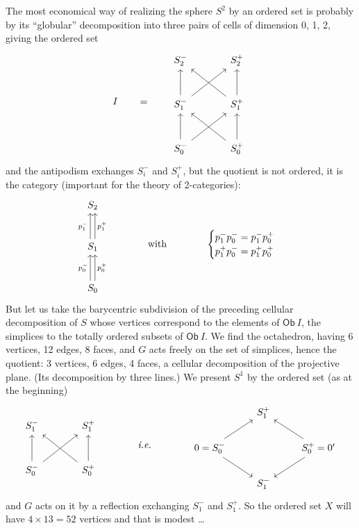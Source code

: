 The most economical way of realizing the sphere $S^2$ by an ordered set is probably by its ``globular'' decomposition into three pairs of cells of dimension 0, 1, 2, giving the ordered set
\[
I \qquad = \qquad
\begin{tikzcd}[row sep=large, column sep=large]
S_2^- & S_2^+ \\
S_1^- \arrow[u] \arrow[ur] & S_1^+ \arrow[u] \arrow[ul] \\
S_0^- \arrow[u] \arrow[ur] & S_0^+ \arrow[u] \arrow[ul]
\end{tikzcd}
\]
and the antipodism exchanges $S_i^-$ and $S_i^+$, but the quotient is not ordered, it is the category (important for the theory of 2-categories):
\[
\begin{tikzcd}[row sep=large]
S_2 \\
S_1 \arrow[u, shift left, "p_1^-"] \arrow[u, shift right, "p_1^+"'] \\
S_0 \arrow[u, shift left, "p_0^-"] \arrow[u, shift right, "p_0^+"']
\end{tikzcd}
\qquad\qquad \text{with} \qquad\qquad
\begin{cases}
p_1^- p_0^- = p_1^- p_0^+ \\
p_1^+ p_0^- = p_1^+ p_0^+
\end{cases}
\]
But let us take the barycentric subdivision of the preceding cellular decomposition of $S$ whose vertices correspond to the elements of $\mathsf{Ob}\ I$, the simplices to the totally ordered subsets of $\mathsf{Ob}\ I$. We find the octahedron, having 6 vertices, 12 edges, 8 faces, and $G$ acts freely on the set of simplices, hence the quotient: 3 vertices, 6 edges, 4 faces, a cellular decomposition of the projective plane. (Its decomposition by three lines.) We present $S^1$ by the ordered set (as at the beginning) %
\[
\begin{tikzcd}[row sep=large, column sep=large]
S_1^- & S_1^+ \\
S_0^- \arrow[u] \arrow[ur] & S_0^+ \arrow[u] \arrow[ul]
\end{tikzcd}
\qquad\qquad \textit{i.e.} \qquad\qquad
\begin{tikzcd}
 & S_1^+ & \\
0 = S_0^- \arrow[ur] \arrow[dr] & & S_0^+ = 0' \arrow[ul] \arrow[dl] \\
 & S_1^- &
\end{tikzcd}
\]
and $G$ acts on it by a reflection exchanging $S_1^-$ and $S_1^+$. So the ordered set $X$ will have $4 \times 13 = 52$ vertices and that is modest \ldots